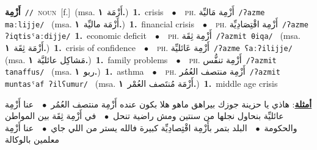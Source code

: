 \documentclass[10pt,a4paper,twoside]{article} %
\begin{document}
\begin{multicols}{2}
{\setlength\topsep{0pt}\textbf{\foreignlanguage{arabic}{أَزْمِة}}\ {\color{gray}\texttt{//}\color{black}}\ \textsc{noun}\ [f.]\ \color{gray}(msa. \foreignlanguage{arabic}{أَزْمَة}~\foreignlanguage{arabic}{\textbf{١.}})\color{black}\ \textbf{1.}~crisis\ \ $\bullet$\ \ \textsc{ph.} \color{gray} \foreignlanguage{arabic}{أَزْمِة مَاليِّة}\color{black}\ {\color{gray}\texttt{/{\sffamily ʔazme maːlijje}/}\color{black}}\ \color{gray} (msa. \foreignlanguage{arabic}{أَزْمَة ماليِّة}~\foreignlanguage{arabic}{\textbf{١.}})\color{black}\ \textbf{1.}~financial crisis\ \ $\bullet$\ \ \textsc{ph.} \color{gray} \foreignlanguage{arabic}{أَزْمِة اقْتِصَادِيِّة}\color{black}\ {\color{gray}\texttt{/{\sffamily ʔazme ʔiqtisˤaːdijje}/}\color{black}}\ \textbf{1.}~economic deficit\ \ $\bullet$\ \ \textsc{ph.} \color{gray} \foreignlanguage{arabic}{أَزْمِة ثِقَة}\color{black}\ {\color{gray}\texttt{/{\sffamily ʔazmit θiqa}/}\color{black}}\ \color{gray} (msa. \foreignlanguage{arabic}{أَزْمَة ثِقَة}~\foreignlanguage{arabic}{\textbf{١.}})\color{black}\ \textbf{1.}~crisis of confidence\ \ $\bullet$\ \ \textsc{ph.} \color{gray} \foreignlanguage{arabic}{أَزْمِة عَائليِّة}\color{black}\ {\color{gray}\texttt{/{\sffamily ʔazme ʕaːʔilijje}/}\color{black}}\ \color{gray} (msa. \foreignlanguage{arabic}{مَشاكِل عائليَّة}~\foreignlanguage{arabic}{\textbf{١.}})\color{black}\ \textbf{1.}~family  problems\ \ $\bullet$\ \ \textsc{ph.} \color{gray} \foreignlanguage{arabic}{أَزْمِة تنفُّس}\color{black}\ {\color{gray}\texttt{/{\sffamily ʔazmit tanaffus}/}\color{black}}\ \color{gray} (msa. \foreignlanguage{arabic}{ربو}~\foreignlanguage{arabic}{\textbf{١.}})\color{black}\ \textbf{1.}~asthma\ \ $\bullet$\ \ \textsc{ph.} \color{gray} \foreignlanguage{arabic}{أَزْمِة منتصف العُمُر}\color{black}\ {\color{gray}\texttt{/{\sffamily ʔazmit muntasˤaf ʔilʕumur}/}\color{black}}\ \color{gray} (msa. \foreignlanguage{arabic}{أَزْمَة مُنتَصف العُمْر}~\foreignlanguage{arabic}{\textbf{١.}})\color{black}\ \textbf{1.}~middle age crisis\  \begin{flushright}\color{gray}\foreignlanguage{arabic}{\textbf{\underline{\foreignlanguage{arabic}{أمثلة}}}: هاذي يا حزينة جوزك بيراهق ماهو هلا بكون عنده أَزْمِة منتصف العُمُر\ $\bullet$\ \  عنا أَزْمِة عائليِّة بنحاول نجلها من سنتين ومش راضية تنحل\ $\bullet$\ \  في أَزْمِة ثِقَة بين المواطن والحكومة\ $\bullet$\ \  البلد بتمر بأَزْمِة اقْتِصادِيِّة كبيرة فالله يستر من اللي جاي\ $\bullet$\ \  عنا أَزْمِة معلمين بالوكالة}\end{flushright}\color{black}} \vspace{2mm}


\end{multicols}
\end{document}
